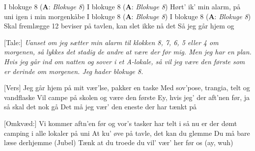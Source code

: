 \documentclass[a4paper,11pt]{article}
\begin{document}
\begin{song}
I blokuge 8 (\textbf{A}: \textit{Blokuge 8})
I blokuge 8 (\textbf{A}: \textit{Blokuge 8})
Hørt' ik' min alarm, på uni igen i min morgenkåbe 
I blokuge 8 (\textbf{A}: \textit{Blokuge 8})
I blokuge 8 (\textbf{A}: \textit{Blokuge 8})
Skal fremlægge 12 beviser på tavlen, kan slet ikke nå det
Så jeg går hjem og


[Tale:] 
\textit{Uanset om jeg sætter min alarm til klokken 8, 7, 6, 5 eller 4 om morgenen, så lykkes det stadig de andre at være der før mig. 
Men jeg har en plan. Hvis jeg går ind om natten og sover i et A-lokale, så vil jeg være den første som er derinde om morgenen. 
Jeg hader blokuge 8. 
}

[Vers] 
Jeg går hjem på mit vær'lse, pakker en taske 
Med sov'pose, trangia, telt og vandflaske 
Vil campe på skolen og være den første  
Ey, hvis jeg' der aft'nen før, ja så skal det nok gå
Det må jeg vær' den eneste der har tænkt på 


[Omkvæd:] 
Vi kommer aftn'en før og vor's tasker har telt i  
så nu er der dømt camping i alle lokaler på uni 
At ku' øve på tavle, det kan du glemme 
Du må bare læse derhjemme 
(Jubel)
Tænk at du troede du vil' vær' her før os (ay, wuh)
\end{song}
\end{document}
